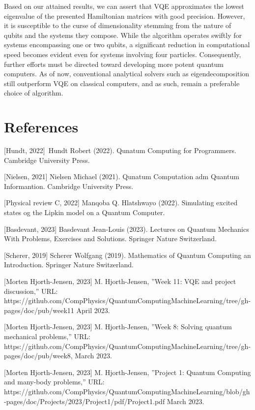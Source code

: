 \documentclass[onecolumn,10pt,cleanfoot]{asme2ej}
\begin{document}
Based on our attained results, we can assert that VQE approximates the lowest eigenvalue of the presented Hamiltonian matrices with good precision. However, it is susceptible to the curse of dimensionality stemming from the nature of qubits and the systems they compose. While the algorithm operates swiftly for systems encompassing one or two qubits, a significant reduction in computational speed becomes evident even for systems involving four particles. Consequently, further efforts must be directed toward developing more potent quantum computers. As of now, conventional analytical solvers such as eigendecomposition still outperform VQE on classical computers, and as such, remain a preferable choice of algorithm.

\section{References}

[Hundt, 2022] Hundt Robert (2022). Qunatum Computing for Programmers. Cambridge University Press.

[Nielsen, 2021] Nielsen Michael (2021). Qunatum Computation adm Quantum Informantion. Cambridge University Press.

[Physical review C, 2022] Manqoba Q. Hlatshwayo (2022). Simulating excited states og the Lipkin model on a Quantum Computer.

[Basdevant, 2023] Basdevant Jean-Louis (2023). Lectures on Quantum Mechanics With Problems, Exercises and Solutions. Springer Nature Switzerland.

[Scherer, 2019] Scherer Wolfgang (2019). Mathematics of Quantum Computing an Introduction. Springer Nature Switzerland.

[Morten Hjorth-Jensen, 2023] M. Hjorth-Jensen, ”Week 11: VQE and project discussion,” URL: https://github.com/CompPhysics/QuantumComputingMachineLearning/tree/gh-pages/doc/pub/week11 April 2023.

[Morten Hjorth-Jensen, 2023] M. Hjorth-Jensen, ”Week 8: Solving quantum mechanical problems,” URL: https://github.com/CompPhysics/QuantumComputingMachineLearning/tree/gh-pages/doc/pub/week8, March 2023.

[Morten Hjorth-Jensen, 2023] M. Hjorth-Jensen, ”Project 1: Quantum Computing and many-body problems,” URL: https://github.com/CompPhysics/QuantumComputingMachineLearning/blob/gh-pages/doc/Projects/2023/Project1/pdf/Project1.pdf March 2023.
\end{document}
